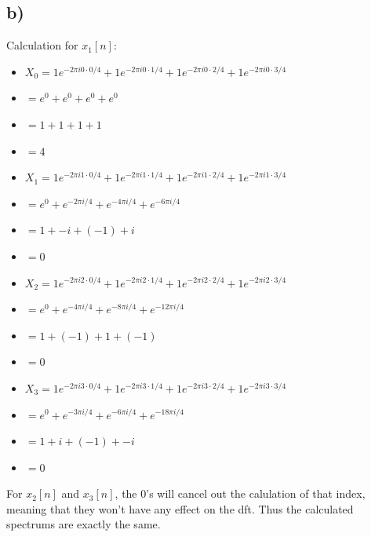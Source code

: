 \subsection*{b)}
Calculation for \(x_1[n]\):
\begin{itemize}[leftmargin=*]
  \item[] \(X_0 = 1 e^{-2 \pi i 0 \cdot 0 / 4} + 1 e^{-2 \pi i 0 \cdot 1 / 4} + 1 e^{-2 \pi i 0 \cdot 2 / 4} + 1 e^{-2 \pi i 0 \cdot 3 / 4}\)
  \item[] \(= e^0 + e^0 + e^0 + e^0\)
  \item[] \(= 1 + 1 + 1 + 1\)
  \item[] \(= 4\)
\end{itemize}
\begin{itemize}[leftmargin=*]
  \item[] \(X_1 = 1 e^{-2 \pi i 1 \cdot 0 / 4} + 1 e^{-2 \pi i 1 \cdot 1 / 4} + 1 e^{-2 \pi i 1 \cdot 2 / 4} + 1 e^{-2 \pi i 1 \cdot 3 / 4}\)
  \item[] \(= e^0 + e^{-2 \pi i / 4} + e^{-4 \pi i / 4} + e^{-6 \pi i / 4}\)
  \item[] \(= 1 + -i + (-1) + i\)
  \item[] \(= 0\)
\end{itemize}
\begin{itemize}[leftmargin=*]
  \item[] \(X_2 = 1 e^{-2 \pi i 2 \cdot 0 / 4} + 1 e^{-2 \pi i 2 \cdot 1 / 4} + 1 e^{-2 \pi i 2 \cdot 2 / 4} + 1 e^{-2 \pi i 2 \cdot 3 / 4}\)
  \item[] \(= e^0 + e^{-4 \pi i / 4} + e^{-8 \pi i / 4} + e^{-12 \pi i / 4}\)
  \item[] \(= 1 + (-1) + 1 + (-1)\)
  \item[] \(= 0\)
\end{itemize}
\begin{itemize}[leftmargin=*]
  \item[] \(X_3 = 1 e^{-2 \pi i 3 \cdot 0 / 4} + 1 e^{-2 \pi i 3 \cdot 1 / 4} + 1 e^{-2 \pi i 3 \cdot 2 / 4} + 1 e^{-2 \pi i 3 \cdot 3 / 4}\)
  \item[] \(= e^0 + e^{-3 \pi i / 4} + e^{-6 \pi i / 4} + e^{-18 \pi i / 4}\)
  \item[] \(= 1 + i + (-1) + -i\)
  \item[] \(= 0\)
\end{itemize}
For \(x_2[n]\) and \(x_3[n]\), the 0's will cancel out the calulation of that index, meaning that they won't have any effect on the dft.
Thus the calculated spectrums are exactly the same.

